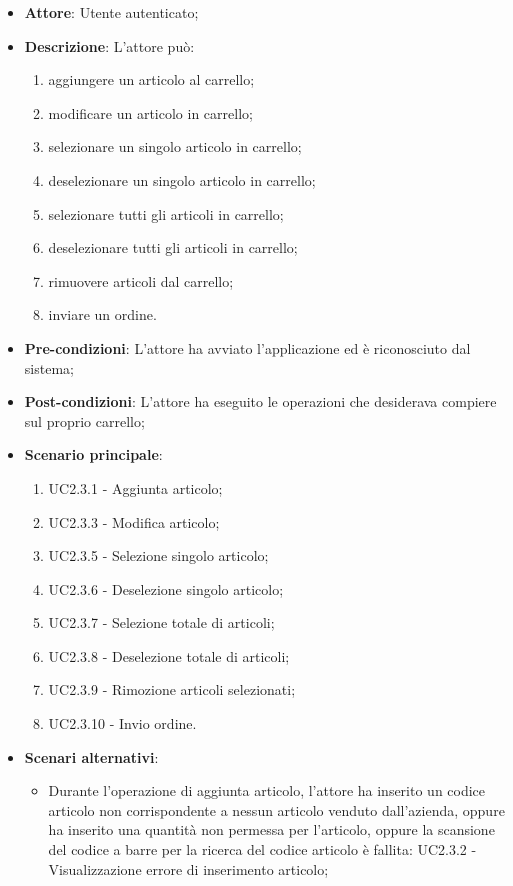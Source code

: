 \begin{itemize}
	\item \textbf{Attore}: Utente autenticato;
	\item \textbf{Descrizione}: L'attore può:
		\begin{enumerate}
			\item aggiungere un articolo al carrello;
			\item modificare un articolo in carrello;
			\item selezionare un singolo articolo in carrello;
			\item deselezionare un singolo articolo in carrello;
			\item selezionare tutti gli articoli in carrello;
			\item deselezionare tutti gli articoli in carrello;
			\item rimuovere articoli dal carrello;
			\item inviare un ordine.
		\end{enumerate}
	\item \textbf{Pre-condizioni}: L'attore ha avviato l'applicazione ed è riconosciuto dal sistema;
	\item \textbf{Post-condizioni}: L'attore ha eseguito le operazioni che desiderava compiere sul proprio carrello;
	\item \textbf{Scenario principale}:
		\begin{enumerate}
			\item UC2.3.1 - Aggiunta articolo;
			\item UC2.3.3 - Modifica articolo;
			\item UC2.3.5 - Selezione singolo articolo;
			\item UC2.3.6 - Deselezione singolo articolo;
			\item UC2.3.7 - Selezione totale di articoli;
			\item UC2.3.8 - Deselezione totale di articoli;
			\item UC2.3.9 - Rimozione articoli selezionati;
			\item UC2.3.10 - Invio ordine.
		\end{enumerate}
	\item \textbf{Scenari alternativi}:
		\begin{itemize}
			\item Durante l'operazione di aggiunta articolo, l'attore ha inserito un codice articolo non corrispondente a nessun articolo venduto dall'azienda, oppure ha inserito una quantità non permessa per l'articolo, oppure la scansione del codice a barre per la ricerca del codice articolo è fallita: UC2.3.2 - Visualizzazione errore di inserimento articolo;

\end{itemize}
\end{itemize}
